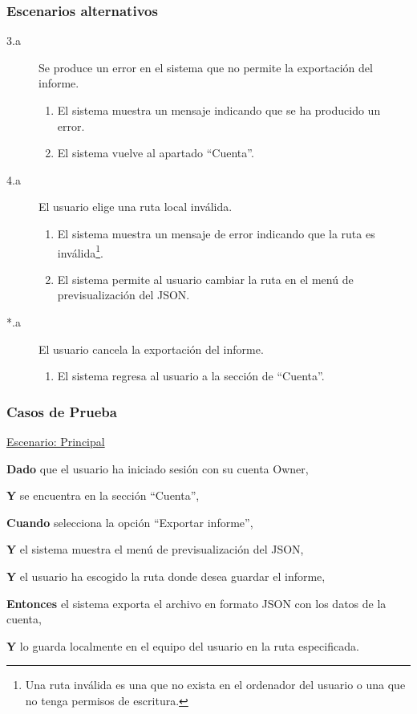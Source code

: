 \subsubsection*{Escenarios alternativos}
\begin{description}
    \item[3.a] Se produce un error en el sistema que no permite la exportación del informe.
    \begin{enumerate}
        \item[3.a.1] El sistema muestra un mensaje indicando que se ha producido un error.
        \item[3.a.2] El sistema vuelve al apartado \enquote{Cuenta}.
    \end{enumerate}

    \newpage %

    \item[4.a] El usuario elige una ruta local inválida.
    \begin{enumerate}
        \item[4.a.1] El sistema muestra un mensaje de error indicando que la ruta es inválida\footnote{Una ruta inválida es una que no exista en el ordenador del usuario o una que no tenga permisos de escritura.}.
        \item[4.a.2] El sistema permite al usuario cambiar la ruta en el menú de previsualización del JSON. %
    \end{enumerate}
    \item[*.a] El usuario cancela la exportación del informe.
    \begin{enumerate}
        \item[*.a.1] El sistema regresa al usuario a la sección de \enquote{Cuenta}.
    \end{enumerate}
\end{description}

\subsubsection*{Casos de Prueba}
\underline{Escenario: Principal}\par
\vspace{0.15cm}
\textbf{Dado} que el usuario ha iniciado sesión con su cuenta Owner,\par
\textbf{Y} se encuentra en la sección \enquote{Cuenta},\par
\textbf{Cuando} selecciona la opción \enquote{Exportar informe},\par
\textbf{Y} el sistema muestra el menú de previsualización del JSON,\par
\textbf{Y} el usuario ha escogido la ruta donde desea guardar el informe,\par
\textbf{Entonces} el sistema exporta el archivo en formato JSON con los datos de la cuenta,\par
\textbf{Y} lo guarda localmente en el equipo del usuario en la ruta especificada.\par
\vspace{0.20cm}

